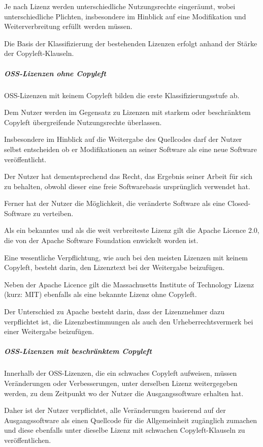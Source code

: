 Je nach Lizenz werden unterschiedliche Nutzungsrechte eingeräumt, wobei  unterschiedliche Plichten, insbesondere im Hinblick auf eine Modifikation und Weiterverbreitung erfüllt werden müssen. 

Die Basis der Klassifizierung der bestehenden Lizenzen erfolgt anhand der Stärke der Copyleft-Klauseln.

\subparagraph{OSS-Lizenzen ohne Copyleft}
OSS-Lizenzen mit keinem Copyleft bilden die erste Klassifizierungsstufe ab. 

Dem Nutzer werden im Gegensatz zu Lizenzen mit starkem oder beschränktem Copyleft übergreifende Nutzungsrechte überlassen. 

Insbesondere im Hinblick auf die Weitergabe des Quellcodes darf der Nutzer selbst entscheiden ob er Modifikationen an seiner Software als eine neue Software veröffentlicht.  

Der Nutzer hat dementsprechend das Recht, das Ergebnis seiner Arbeit für sich zu behalten, obwohl dieser eine freie Softwarebasis ursprünglich verwendet hat. 

Ferner hat der Nutzer die Möglichkeit, die veränderte Software als eine Closed-Software zu verteiben. 

Als ein bekanntes und als die weit verbreiteste Lizenz gilt die Apache Licence 2.0, die von der Apache Software Foundation enwickelt worden ist. 

Eine wesentliche Verpflichtung, wie auch bei den meisten Lizenzen mit keinem Copyleft, besteht darin, den Lizenztext bei der Weitergabe beizufügen. 

Neben der Apache Licence gilt die Massachusetts Institute of Technology Lizenz (kurz: MIT) ebenfalls als eine bekannte Lizenz ohne Copyleft. 

Der Unterschied zu Apache besteht darin, dass der Lizenznehmer dazu verpflichtet ist, die Lizenzbestimmungen als auch den Urheberrechtsvermerk bei einer Weitergabe beizufügen. 

\subparagraph{OSS-Lizenzen mit beschränktem Copyleft}
Innerhalb der OSS-Lizenzen, die ein schwaches Copyleft aufweisen, müssen Veränderungen oder Verbesserungen, unter derselben Lizenz weitergegeben werden, zu dem Zeitpunkt wo der Nutzer die Ausgangssoftware erhalten hat. 

Daher ist der Nutzer verpflichtet, alle Veränderungen basierend auf der Ausgangssoftware als einen Quellcode für die Allgemeinheit zugänglich zumachen und diese ebenfalls unter dieselbe Lizenz mit schwachen Copyleft-Klauseln zu veröffentlichen.  

